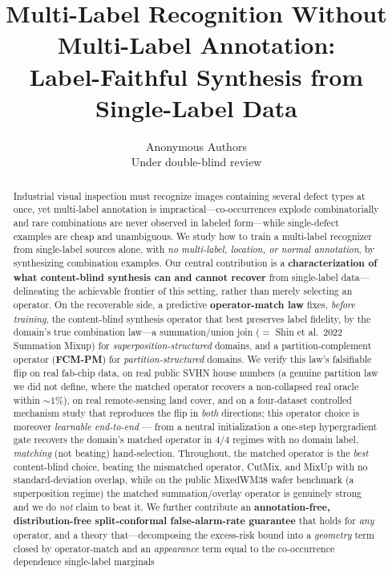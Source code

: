 \documentclass[11pt]{article}
\title{Multi-Label Recognition Without Multi-Label Annotation:\\
Label-Faithful Synthesis from Single-Label Data}
\author{Anonymous Authors\\Under double-blind review}
\date{}
\begin{document}
\maketitle

\begin{abstract}
Industrial visual inspection must recognize images containing several defect
types at once, yet multi-label annotation is impractical---co-occurrences
explode combinatorially and rare combinations are never observed in labeled
form---while single-defect examples are cheap and unambiguous. We study how to
train a multi-label recognizer from single-label sources alone, with \emph{no
multi-label, location, or normal annotation}, by synthesizing combination
examples. Our central contribution is a \textbf{characterization of what
content-blind synthesis can and cannot recover} from single-label data---delineating
the achievable frontier of this setting, rather than merely selecting an operator. On
the recoverable side, a predictive \textbf{operator-match law} fixes, \emph{before
training}, the content-blind synthesis operator that best preserves label fidelity, by
the domain's true combination law---a summation/union join (${=}$ Shin et al.\ 2022
Summation Mixup) for \emph{superposition-structured} domains, and a partition-complement
operator (\textbf{FCM-PM}) for \emph{partition-structured} domains. We verify this law's falsifiable flip on
real fab-chip data, on real public SVHN house numbers (a genuine partition law
we did not define, where the matched operator recovers a non-collapsed real
oracle within ${\sim}1\%$), on real remote-sensing land cover, and on a
four-dataset controlled mechanism study that reproduces the flip in \emph{both}
directions; this operator choice is moreover \emph{learnable end-to-end} --- from a
neutral initialization a one-step hypergradient gate recovers the domain's matched
operator in $4/4$ regimes with no domain label, \emph{matching} (not beating)
hand-selection. Throughout, the matched operator is the \emph{best} content-blind
choice, beating the mismatched operator, CutMix, and MixUp with no
standard-deviation overlap, while on the public MixedWM38 wafer benchmark
(a superposition regime) the matched summation/overlay operator is genuinely
strong and we do \emph{not} claim to beat it. We further contribute an
\textbf{annotation-free, distribution-free split-conformal false-alarm-rate
guarantee} that holds for \emph{any} operator, and a theory that---decomposing the
excess-risk bound into a \emph{geometry} term closed by operator-match and an
\emph{appearance} term equal to the co-occurrence dependence single-label marginals

\end{abstract}
\end{document}
